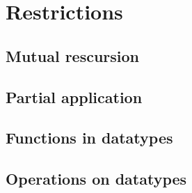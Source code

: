 
\section{Restrictions} \label{chapter:restrictions}

\subsection{Mutual rescursion}
\subsection{Partial application}
\subsection{Functions in datatypes}
\subsection{Operations on datatypes} \label{chapter:nonconstant_zeros}

